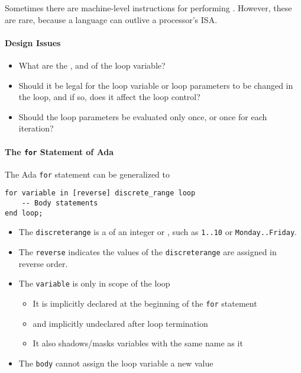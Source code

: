 \begin{remark*}
  Sometimes there are machine-level instructions for performing .
  However, these are rare, because a language can outlive a processor's ISA.\@
\end{remark*}

\paragraph{Design Issues}\label{par:Counter_Controlled_Loops-Design_Issues}
\begin{itemize}[noitemsep]
\item What are the , and  of the loop variable?
\item Should it be legal for the loop variable or loop parameters to be changed in the loop, and if so, does it affect the loop control?
\item Should the loop parameters be evaluated only once, or once for each iteration?
\end{itemize}

\paragraph{The \texttt{for} Statement of Ada}\label{par:Counter_Controlled_Loops-Ada}
The Ada \texttt{for} statement can be generalized to
\begin{verbatim}
for variable in [reverse] discrete_range loop
    -- Body statements
end loop;
\end{verbatim}
\begin{itemize}[noitemsep]
\item The \texttt{discrete\textunderscore{}range} is a  of an integer or , such as \texttt{1..10} or \texttt{Monday..Friday}.
\item The \texttt{reverse}  indicates the values of the \texttt{discrete\textunderscore{}range} are assigned in reverse order.
\item The \texttt{variable} is only in scope of the loop
  \begin{itemize}[noitemsep]
  \item It is implicitly declared at the beginning of the \texttt{for} statement
  \item and implicitly undeclared after loop termination
  \item It also shadows/masks variables with the same name as it
  \end{itemize}
\item The \texttt{body} cannot assign the loop variable a new value
\end{itemize}

